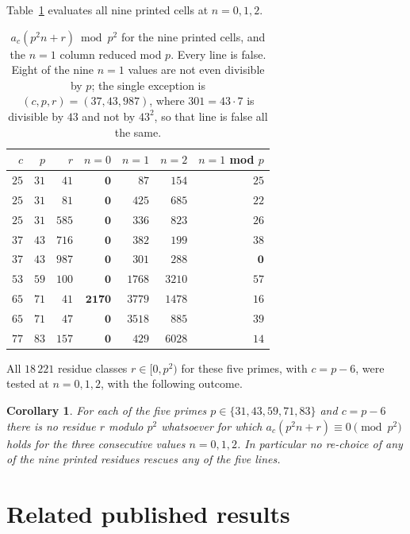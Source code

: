 \documentclass[11pt]{amsart}
\newtheorem{corollary}[theorem]{Corollary}
\theoremstyle{definition}
\theoremstyle{remark}
\begin{document}
Table~\ref{tab:cells} evaluates all nine printed cells at $n=0,1,2$.

\begin{table}[ht]
\small
\begin{tabular}{rrr|rrr|r}
$c$ & $p$ & $r$ & $n=0$ & $n=1$ & $n=2$ & $n=1$ mod $p$\\
\hline
$25$ & $31$ & $41$ & $\mathbf{0}$ & $87$ & $154$ & $25$\\
$25$ & $31$ & $81$ & $\mathbf{0}$ & $425$ & $685$ & $22$\\
$25$ & $31$ & $585$ & $\mathbf{0}$ & $336$ & $823$ & $26$\\
$37$ & $43$ & $716$ & $\mathbf{0}$ & $382$ & $199$ & $38$\\
$37$ & $43$ & $987$ & $\mathbf{0}$ & $301$ & $288$ & $\mathbf{0}$\\
$53$ & $59$ & $100$ & $\mathbf{0}$ & $1768$ & $3210$ & $57$\\
$65$ & $71$ & $41$ & $\mathbf{2170}$ & $3779$ & $1478$ & $16$\\
$65$ & $71$ & $47$ & $\mathbf{0}$ & $3518$ & $885$ & $39$\\
$77$ & $83$ & $157$ & $\mathbf{0}$ & $429$ & $6028$ & $14$
\end{tabular}
\medskip
\caption{$a_c(p^2n+r)\bmod p^2$ for the nine printed cells, and the $n=1$ column reduced
mod $p$. Every line is false. Eight of the nine $n=1$ values are not even divisible by
$p$; the single exception is $(c,p,r)=(37,43,987)$, where $301=43\cdot7$ is divisible by
$43$ and not by $43^2$, so that line is false all the same.}
\label{tab:cells}
\end{table}

All $18\,221$ residue classes $r\in[0,p^2)$ for these five primes, with $c=p-6$, were
tested at $n=0,1,2$, with the following outcome.

\begin{corollary}\label{cor:census}
For each of the five primes $p\in\{31,43,59,71,83\}$ and $c=p-6$ there is no residue
$r$ modulo $p^2$ whatsoever for which $a_c(p^2n+r)\equiv0\pmod{p^2}$ holds for the three
consecutive values $n=0,1,2$. In particular no re-choice of any of the nine printed
residues rescues any of the five lines.
\end{corollary}

\section{Related published results}\label{sec:diag}
\end{document}
